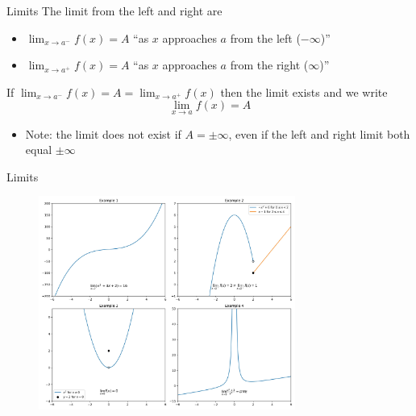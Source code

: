 \documentclass[aspectratio=169]{beamer}
\begin{document}
\begin{frame}{Limits}\label{main1}
The limit from the left and right are
\begin{itemize}
\begin{itemize}
    \item \(\lim_{x \to a^-} f(x) = A\) “as \(x\) approaches \(a\) from the left (\(-\infty\))”
    \item \(\lim_{x \to a^+} f(x) = A\) “as \(x\) approaches \(a\) from the right (\(\infty\))”
\end{itemize}
\end{itemize}
If \(\lim_{x \to a^-} f(x) = A = \lim_{x \to a^+} f(x)\) then the limit exists and we write
\[
\lim_{x \to a} f(x) = A
\]
\begin{itemize}
    \item Note: the limit does not exist if \(A = \pm\infty\), even if the left and right limit both equal \(\pm\infty\)
\end{itemize}
\end{frame}

\begin{frame}{Limits}\label{main1}
    \begin{figure}
        \centering
        \includegraphics[width=0.75\textwidth]{figures/limits_example.jpg}
    \end{figure}
\end{frame}
\end{document}
